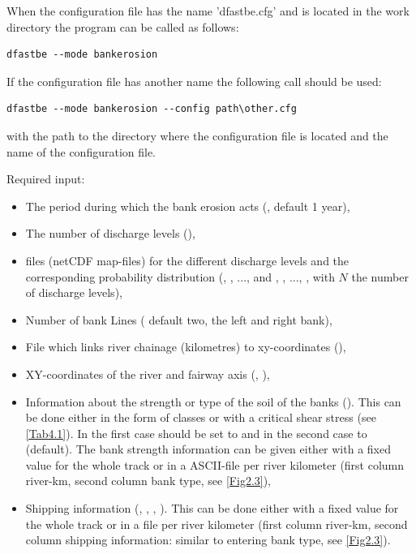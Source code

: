 When the configuration file has the name 'dfastbe.cfg' and is located in the work directory the program can be called as follows:

\begin{Verbatim}
dfastbe --mode bankerosion
\end{Verbatim}

If the configuration file has another name the following call should be used:

\begin{Verbatim}
dfastbe --mode bankerosion --config path\other.cfg
\end{Verbatim}

with  the path to the directory where the configuration file is located and  the name of the configuration file.

Required input:

\begin{itemize}
\item The period during which the bank erosion acts (, default 1 year),
\item The number of discharge levels (),
\item \dflowfm files (netCDF map-files) for the different discharge levels and the corresponding probability distribution (, , ...,  and , , ..., , with $N$ the number of discharge levels),
\item Number of bank Lines ( default two, the left and right bank),
\item File which links river chainage (kilometres) to xy-coordinates (),
\item XY-coordinates of the river and fairway axis (, ),
\item Information about the strength or type of the soil of the banks ().
This can be done either in the form of classes or with a critical shear stress (see \autoref{Tab4.1}).
In the first case  should be set to  and in the second case to  (default).
The bank strength information can be given either with a fixed value for the whole track or in a ASCII-file per river kilometer (first column river-km, second column bank type, see \autoref{Fig2.3}),
\item Shipping information (, , , ).
This can be done either with a fixed value for the whole track or in a file per river kilometer (first column river-km, second column shipping information: similar to entering bank type, see \autoref{Fig2.3}).
\end{itemize}

